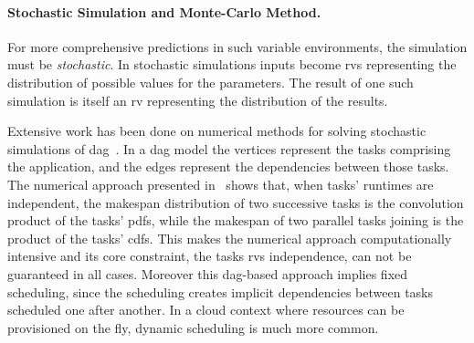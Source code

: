 \documentclass[]{llncs}
\begin{document}
\paragraph{Stochastic Simulation and Monte-Carlo Method.}
For  more   comprehensive  predictions  in  such   variable  environments,  the
simulation must  be \emph{stochastic}.  In stochastic simulations  inputs become
\acfp{rv} representing the  distribution of possible values  for the parameters.
The  result  of one  such  simulation  is  itself  an \ac{rv}  representing  the
distribution  of the  results. 

Extensive  work  has  been  done  on numerical  methods  for  solving  stochastic
simulations of  \ac{dag}~\cite{Li97,Ludwig01}. In a \ac{dag}  model the vertices
represent  the tasks  comprising the  application, and  the edges  represent the
dependencies   between   those   tasks.   The   numerical   approach   presented
in~\cite{Li97,Ludwig01}  shows that,  when tasks'  runtimes are  independent, the
makespan distribution of two successive tasks  is the convolution product of the
tasks'  \aclp{pdf}, while  the makespan  of two  parallel tasks  joining is  the
product  of   the  tasks'   \aclp{cdf}.  This   makes  the   numerical  approach
computationally  intensive   and  its  core  constraint,   the  tasks  \acp{rv}
independence, can  not be guaranteed  in all cases. Moreover  this \ac{dag}-based
approach  implies  fixed  scheduling,  since  the  scheduling  creates  implicit
dependencies between tasks scheduled one after another. In a cloud context where
resources can be provisioned on the fly, dynamic scheduling is much more common.
\end{document}
